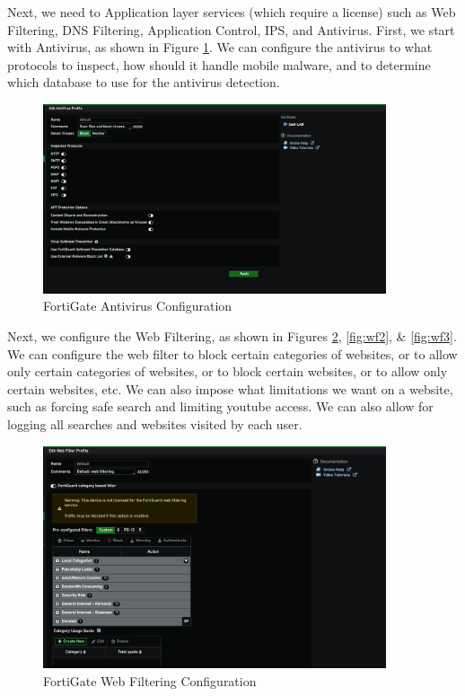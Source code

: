 \documentclass[12pt]{report}
\begin{document}
Next, we need to Application layer services (which require a license) such as Web Filtering, DNS Filtering, Application Control, IPS, and Antivirus. 
First, we start with Antivirus, as shown in Figure \ref{fig:antivirus}. We can configure the antivirus to what protocols to inspect, how should it handle mobile malware, and to determine which database to use for the antivirus detection.
\begin{figure}
    \centering
    \includegraphics[width=0.9\textwidth]{images/Implementation/av.png}
    \caption{FortiGate Antivirus Configuration}
    \label{fig:antivirus}
\end{figure}
Next, we configure the Web Filtering, as shown in Figures \ref{fig:wf1}, \ref{fig:wf2}, \& \ref{fig:wf3}. We can configure the web filter to block certain categories of websites, or to allow only certain categories of websites, or to block certain websites, or to allow only certain websites, etc. We can also impose what limitations we want on a website, such as forcing safe search and limiting youtube access. We can also allow for logging all searches and websites visited by each user.
\begin{figure}
    \centering
    \includegraphics[width=0.9\textwidth]{images/Implementation/wf1.png}
    \caption{FortiGate Web Filtering Configuration}
    \label{fig:wf1}
\end{figure}
\end{document}
